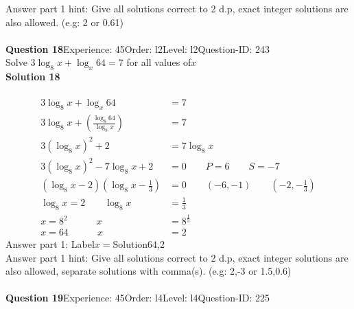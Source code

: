\documentclass{article}
\begin{document}
Answer part 1 hint: \hspace{15pt}Give all solutions correct to 2 d.p, exact integer solutions are also allowed. (e.g: 2 or 0.61)\\
\\[4pt]
\noindent\textbf{Question 18}\hspace{20pt}Experience: 45\hspace{20pt}Order: l2\hspace{20pt}Level: l2\hspace{20pt}Question-ID: 243\\[2pt]
Solve $3\log_{8}x+\log_{x}64=7$ for all values of$x$\\[4pt]
\noindent\textbf{Solution 18}\\[2pt]
\\[-35pt]\begin{align*}
3\log_{8}x+\log_{x}64&=7\\[2pt]
3\log_{8}x+\left(\displaystyle\frac{\log_{8}64}{\log_{8}x}\right)&=7\\[2pt]
3(\log_{8}x)^2+2&=7\log_{8}x\\[2pt]
3(\log_{8}x)^2-7\log_{8}x+2&=0\qquad P=6 \qquad S=-7\\[2pt]
(\log_{8}x-2)\left(\log_{8}x-\displaystyle\frac{1}{3}\right)&=0\qquad (-6,-1)\qquad \left(-2,-\displaystyle\frac{1}{3}\right)\\[2pt]
\log_{8}x=2 \qquad \log_{8}x&=\displaystyle\frac{1}{3}\\[2pt]
x=8^2 \hspace{36pt} x&=8^{\frac{1}{3}}\\[2pt]
x=64 \hspace{36pt} x&=2
\end{align*}
Answer part 1: \hspace{10pt}Label\hspace{10pt}$x=$\hspace{10pt}Solution\hspace{10pt}64,2\\
Answer part 1 hint: \hspace{15pt}Give all solutions correct to 2 d.p, exact integer solutions are also allowed, separate solutions with comma(s). (e.g: 2,-3 or 1.5,0.6)\\
\\[4pt]
\noindent\textbf{Question 19}\hspace{20pt}Experience: 45\hspace{20pt}Order: l4\hspace{20pt}Level: l4\hspace{20pt}Question-ID: 225\\[2pt]
\end{document}
